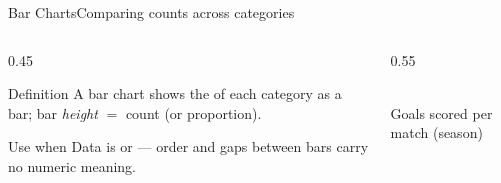 \documentclass[aspectratio=169,11pt]{beamer}
\begin{document}
\begin{frame}{Bar Charts}{Comparing counts across categories}
  \begin{columns}[T]
    \begin{column}{0.45\textwidth}
      \begin{block}{Definition}
        \small A bar chart shows the  of each category
        as a bar; bar \emph{height} $=$ count (or proportion).
      \end{block}
      \begin{exampleblock}{Use when}
        \small Data is  or  — order and
        gaps between bars carry no numeric meaning.
      \end{exampleblock}
    \end{column}
    \begin{column}{0.55\textwidth}
      \begin{center}
      \\
      \scriptsize Goals scored per match (season)
      \end{center}
    \end{column}
  \end{columns}
\end{frame}
\end{document}
